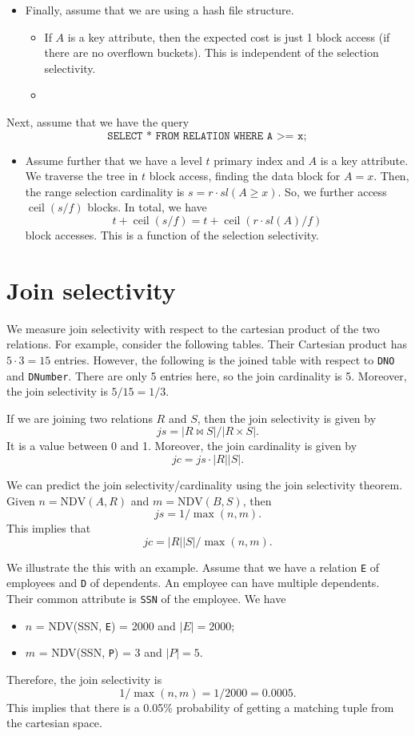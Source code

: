\documentclass[a4paper, openany]{memoir}
\theoremstyle{definition}
\theoremstyle{plain}
\begin{document}
\begin{itemize}
    \item Finally, assume that we are using a hash file structure.
    \begin{itemize}
        \item If $A$ is a key attribute, then the expected cost is just 1 block access (if there are no overflown buckets). This is independent of the selection selectivity.
        \item 
    \end{itemize}
\end{itemize}

Next, assume that we have the query
\[\texttt{SELECT * FROM RELATION WHERE A >= x};\]
\begin{itemize}
    \item Assume further that we have a level $t$ primary index and $A$ is a key attribute. We traverse the tree in $t$ block access, finding the data block for $A = x$. Then, the range selection cardinality is $s = r \cdot \textit{sl}(A \geq x)$. So, we further access $\operatorname{ceil}(s/f)$ blocks. In total, we have
    \[t + \operatorname{ceil}(s/f) = t + \operatorname{ceil}(r \cdot \textit{sl}(A)/f)\]
    block accesses. This is a function of the selection selectivity.
\end{itemize}
\newpage

\section{Join selectivity}
We measure join selectivity with respect to the cartesian product of the two relations. For example, consider the following tables.
Their Cartesian product has $5 \cdot 3 = 15$ entries. However, the following is the joined table with respect to \texttt{DNO} and \texttt{DNumber}.
There are only 5 entries here, so the join cardinality is 5. Moreover, the join selectivity is $5/15 = 1/3$.

If we are joining two relations $R$ and $S$, then the join selectivity is given by
\[\textit{js} = |R \bowtie S|/|R \times S|.\]
It is a value between 0 and 1. Moreover, the join cardinality is given by
\[\textit{jc} = \textit{js} \cdot |R| |S|.\]

We can predict the join selectivity/cardinality using the join selectivity theorem. Given $n = \text{NDV}(A, R)$ and $m = \text{NDV}(B, S)$, then
\[\textit{js} = 1/\max(n, m).\]
This implies that 
\[\textit{jc} = |R| |S| / \max(n, m).\]

We illustrate the this with an example. Assume that we have a relation \texttt{E} of employees and \texttt{D} of dependents. An employee can have multiple dependents. Their common attribute is \texttt{SSN} of the employee. We have
\begin{itemize}
    \item $n$ = NDV(SSN, \texttt{E}) = 2000 and $|E| = 2000$;
    \item $m$ = NDV(SSN, \texttt{P}) = 3 and $|P| = 5$.
\end{itemize}
Therefore, the join selectivity is
\[1/\max(n, m) = 1/2000 = 0.0005.\]
This implies that there is a 0.05\% probability of getting a matching tuple from the cartesian space.
\end{document}
